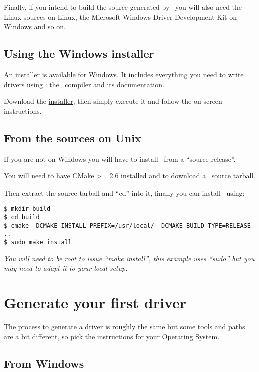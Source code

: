 \documentclass[american]{rtxarticle}
\begin{document}
Finally, if you intend to build the source generated by \rtx\ you will also need
the Linux sources on Linux, the Microsoft Windows Driver Development Kit on
Windows and so on.

\subsection{Using the Windows installer}

An installer is available for Windows. It includes everything you need to write
drivers using \rtx: the \rtx\ compiler and its documentation.

Download the \href{http://rathaxes.googlecode.com/files/rathaxes-latest.exe}{installer},
then simply execute it and follow the on-screen instructions.

\subsection{From the sources on Unix}

If you are not on Windows you will have to install \rtx\ from a ``source
release''.

You will need to have CMake >= 2.6 installed and to download a
\href{http://rathaxes.googlecode.com/files/rathaxes-src-latest.tar.gz}{\rtx\ source tarball}.

Then extract the source tarball and ``cd'' into it, finally you can install
\rtx\ using:

\begin{lstlisting}
$ mkdir build
$ cd build
$ cmake -DCMAKE_INSTALL_PREFIX=/usr/local/ -DCMAKE_BUILD_TYPE=RELEASE ..
$ sudo make install
\end{lstlisting}

\emph{You will need to be root to issue ``make install'', this example uses
``sudo'' but you may need to adapt it to your local setup.}

\section{Generate your first driver}

The process to generate a driver is roughly the same but some tools and paths
are a bit different, so pick the instructions for your Operating System.

\subsection{From Windows}
\end{document}
